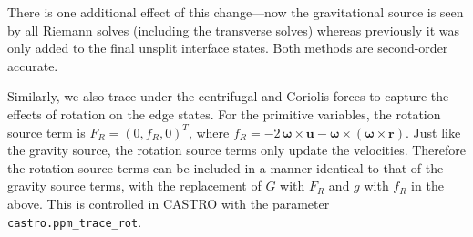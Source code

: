 \documentclass[iop]{../emulateapj}
\begin{document}
There is one additional effect of this change---now the gravitational
source is seen by all Riemann solves (including the transverse solves)
whereas previously it was only added to the final unsplit interface
states.  Both methods are second-order accurate.

Similarly, we also trace under the centrifugal and Coriolis forces to capture
the effects of rotation on the edge states. For the primitive variables, the rotation
source term is $F_R = (0, f_R, 0)^T$, where $f_R = -2\, {\bm{\omega}} \times \mathbf{u} - {\bm\omega}\times \left({\bm\omega} \times \mathbf{r}\right).$
Just like the gravity source, the rotation source terms only update the velocities. Therefore 
the rotation source terms can be included in a manner identical to that of the gravity source
terms, with the replacement of $G$ with $F_R$ and $g$ with $f_R$ in the above. This is controlled in CASTRO
with the parameter {\tt castro.ppm\_trace\_rot}.



\clearpage




\clearpage
\end{document}
